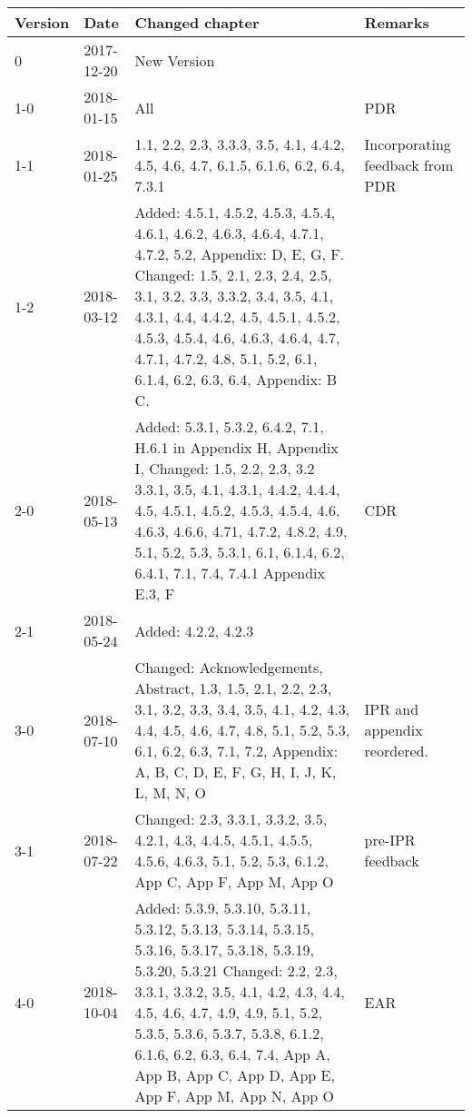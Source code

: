 \begin{longtable}{|p{1.5cm}|p{2cm}|p{6cm}|p{3cm}|}\hline
\centering
\textbf{Version} & \textbf{Date}       & \textbf{Changed chapter}   & \textbf{Remarks}  \\\hline
0       & 2017-12-20 & New Version   &          \\
1-0     & 2018-01-15 & All          & PDR                             \\
1-1     & 2018-01-25 & 1.1, 2.2, 2.3, 3.3.3, 3.5, 4.1, 4.4.2, 4.5, 4.6, 4.7, 6.1.5, 6.1.6, 6.2, 6.4, 7.3.1                                                                                                                                                                                        & Incorporating feedback from PDR \\
1-2     & 2018-03-12 &  Added: 4.5.1, 4.5.2, 4.5.3, 4.5.4, 4.6.1, 4.6.2, 4.6.3, 4.6.4, 4.7.1, 4.7.2, 5.2, Appendix: D, E, G, F.  Changed: 1.5, 2.1, 2.3, 2.4, 2.5, 3.1, 3.2, 3.3, 3.3.2, 3.4, 3.5, 4.1, 4.3.1, 4.4, 4.4.2, 4.5, 4.5.1, 4.5.2, 4.5.3, 4.5.4, 4.6, 4.6.3, 4.6.4, 4.7, 4.7.1, 4.7.2, 4.8, 5.1, 5.2, 6.1, 6.1.4, 6.2, 6.3, 6.4, Appendix: B C.                                                     &                                 \\
2-0     & 2018-05-13 & Added: 5.3.1, 5.3.2, 6.4.2, 7.1, H.6.1 in Appendix H, Appendix I, Changed: 1.5, 2.2, 2.3, 3.2 3.3.1, 3.5, 4.1, 4.3.1, 4.4.2, 4.4.4, 4.5, 4.5.1, 4.5.2, 4.5.3, 4.5.4, 4.6, 4.6.3, 4.6.6, 4.71, 4.7.2, 4.8.2, 4.9, 5.1, 5.2, 5.3, 5.3.1, 6.1, 6.1.4, 6.2, 6.4.1, 7.1, 7.4, 7.4.1 Appendix E.3, F & CDR   \\
2-1     & 2018-05-24 & Added: 4.2.2, 4.2.3 & \\
3-0     & 2018-07-10  & Changed: Acknowledgements, Abstract, 1.3, 1.5, 2.1, 2.2, 2.3, 3.1, 3.2, 3.3, 3.4, 3.5, 4.1, 4.2, 4.3, 4.4, 4.5, 4.6, 4.7, 4.8, 5.1, 5.2, 5.3, 6.1, 6.2, 6.3, 7.1, 7.2, Appendix: A, B, C, D, E, F, G, H, I, J, K, L, M, N, O & IPR and appendix reordered. \\ 
3-1     & 2018-07-22  & Changed: 2.3, 3.3.1, 3.3.2, 3.5, 4.2.1, 4.3, 4.4.5, 4.5.1, 4.5.5, 4.5.6, 4.6.3, 5.1, 5.2, 5.3, 6.1.2, App C, App F, App M, App O   & pre-IPR feedback\\ \hline 
4-0 & 2018-10-04 & Added: 5.3.9, 5.3.10, 5.3.11, 5.3.12, 5.3.13, 5.3.14, 5.3.15, 5.3.16, 5.3.17, 5.3.18, 5.3.19, 5.3.20, 5.3.21 Changed: 2.2, 2.3, 3.3.1, 3.3.2, 3.5, 4.1, 4.2, 4.3, 4.4, 4.5, 4.6, 4.7, 4.9, 4.9, 5.1, 5.2, 5.3.5, 5.3.6, 5.3.7, 5.3.8, 6.1.2, 6.1.6, 6.2, 6.3, 6.4, 7.4, App A, App B, App C, App D, App E, App F, App M, App N, App O  & EAR \hline
\end{longtable}           